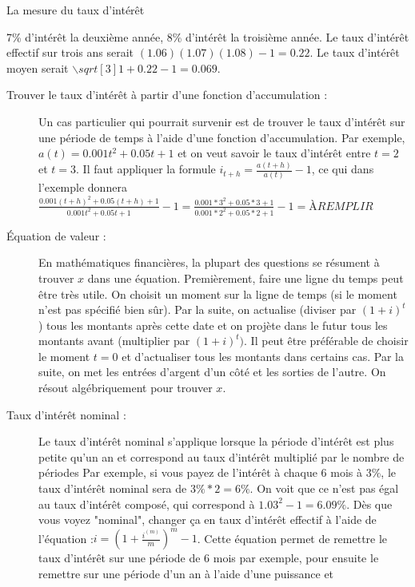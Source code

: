 \documentclass[10pt, french]{article}
\begin{document}
\begin{multicols*}{3}
\begin{mathfinch1}{La mesure du taux d'intérêt}
\begin{description}
    7\% d'intérêt la deuxième année, 8\% d'intérêt la troisième année. Le taux d'intérêt effectif sur trois ans serait $(1.06)(1.07)(1.08) - 1 =  0.22$. 
    Le taux d'intérêt moyen serait $∖sqrt[3]{1 + 0.22} - 1 = 0.069$.
\end{description}
\begin{description}%
    \item[Trouver le taux d'intérêt à partir d'une fonction d'accumulation :] Un cas particulier qui pourrait survenir est de trouver le taux d'intérêt sur une période 
    de temps à l'aide d'une fonction d'accumulation. Par exemple, $a(t) = 0.001t^2 + 0.05t + 1$ et on veut savoir le taux d'intérêt entre $t=2$ et $t=3$. Il faut appliquer la formule
    $i_{t+h} = \frac{a(t+h)}{a(t)} - 1 $, ce qui dans l'exemple donnera $\frac{0.001(t+h)^2 + 0.05(t+h) + 1}{0.001t^2 + 0.05t + 1} - 1 = \frac{0.001*3^2 + 0.05*3 + 1}{0.001*2^2 + 0.05*2 + 1} - 1 = À REMPLIR$
\end{description}
\begin{description} %
    \item[Équation de valeur :] En mathématiques financières,  la plupart des questions se résument à trouver $x$ dans une équation. 
    Premièrement, faire une ligne du temps peut être très utile. On choisit un moment sur la ligne de temps (si le moment n'est pas spécifié bien sûr).
    Par la suite, on actualise (diviser par $(1 + i)^t$) tous les montants après cette date et on projète dans le futur tous les montants avant (multiplier par $(1 + i)^t)$. 
    Il peut être préférable de choisir le moment $t = 0$ et d'actualiser tous les montants dans certains cas. Par la suite, on met les entrées d'argent d'un côté et les sorties de l'autre. 
    On résout algébriquement pour trouver $x$.
\end{description}
\begin{description} 
    \item[Taux d'intérêt nominal :] Le taux d'intérêt nominal s'applique lorsque la période d'intérêt est plus petite qu'un an et correspond au taux d'intérêt multiplié par le nombre de périodes
    Par exemple, si vous payez de l'intérêt à chaque 6 mois à 3\%, le taux d'intérêt nominal sera de $3\% * 2 = 6\%$. On voit que ce n'est pas égal au taux d'intérêt composé, 
    qui correspond à $1.03^2 - 1 = 6.09\%$. Dès que vous voyez "nominal", changer ça en taux d'intérêt effectif à l'aide de l'équation :$i = (1 + \frac{i^(m)}{m})^m - 1$. 
    Cette équation permet de remettre le taux d'intérêt sur une période de 6 mois par exemple, pour ensuite le remettre sur une période d'un an à l'aide d'une puissance et 

\end{description}
\end{mathfinch1}
\end{multicols*}
\end{document}
